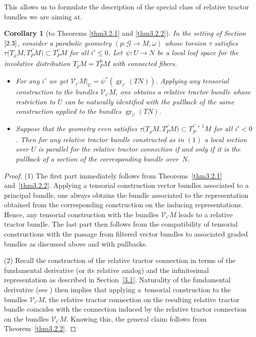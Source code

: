 \documentclass[pdftex]{sigma}
\numberwithin{equation}{section}
\newtheorem{Corollary}[Theorem]{Corollary}
\def\Cal{\mathcal}
\newcommand{\om}{\omega}
\newcommand{\gr}{\operatorname{gr}}
\begin{document}
This allows us to formulate the description of the special class of relative tractor
bundles we are aiming at.
\begin{Corollary}[to Theorems \ref{thm3.2.1} and \ref{thm3.2.2}] \label{cor3.3}
In the setting of Section~$\ref{2.3}$, consider a parabolic geometry $(p\colon \Cal G\to M,\om)$
whose torsion $\tau$ satisfies $\tau\bigl(T_\rho M,T^{i'}_PM\bigr)\subset T^{i'}_PM$ for all
$i'\leq 0$. Let~${\psi\colon U\to N}$ be a local leaf space for the involutive distribution
$T_\rho M=T^0_PM$ with connected fibers.
\begin{itemize}\itemsep=0pt
\item[$(1)$] For any $i'$ we get $\Cal V_{i'}M|_U=\psi^*(\gr_{i'}(TN))$. Applying any
tensorial construction to the bundles $\Cal V_{i'}M$, one obtains a relative tractor
bundle whose restriction to $U$ can be naturally identified with the pullback of the
same construction applied to the bundles $\gr_{i'}(TN)$.
\item[$(2)$] Suppose that the geometry even satisfies $\tau\bigl(T_\rho M,T^{i'}_PM\bigr)\subset
T^{i'+1}_PM$ for all $i'<0$. Then for any relative
tractor bundle constructed as in $(1)$ a local section over $U$ is parallel for the
relative tractor connection if and only if it is the pullback of a section of the
corresponding bundle over~$N$.
\end{itemize}
\end{Corollary}
\begin{proof}
 (1) The first part immediately follows from Theorems~\ref{thm3.2.1} and~\ref{thm3.2.2}. Applying a tensorial construction vector bundles associated to a
 principal bundle, one always obtains the bundle associated to the representation
 obtained from the corresponding construction on the inducing representations. Hence, any tensorial construction with the bundles $\Cal V_{i'}M$ leads to a relative
 tractor bundle. The last part then follows from the compatibility of tensorial
 constructions with the passage from filtered vector bundles to associated graded
 bundles as discussed above and with pullbacks.

(2) Recall the construction of the relative tractor connection in terms of the
 fundamental derivative (or its relative analog) and the infinitesimal
 representation as described in Section~\ref{3.1}. Naturality of the fundamental
 derivative (see \cite[Section 1.5.8]{book}) then implies that applying
 a~tensorial construction to the bundles $\Cal V_{i'}M$, the relative tractor
 connection on the resulting relative tractor bundle coincides with the connection
 induced by the relative tractor connection on the bundles $\Cal V_{i'}M$. Knowing
 this, the general claim follows from Theorem~\ref{thm3.2.2}.
\end{proof}
\end{document}

